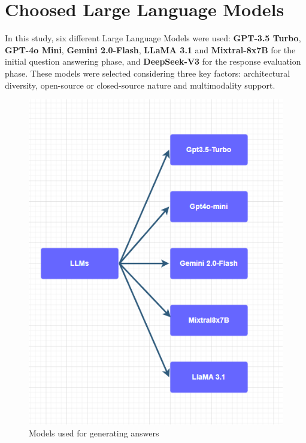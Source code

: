 \section{Choosed Large Language Models}
In this study, six different Large Language Models were used: \textbf{GPT-3.5 Turbo}, \textbf{GPT-4o Mini}, \textbf{Gemini 2.0-Flash}, \textbf{LLaMA 3.1} and \textbf{Mixtral-8x7B} for the initial question answering phase, and \textbf{DeepSeek-V3} for the response evaluation phase. These models were selected considering three key factors: architectural diversity, open-source or closed-source nature and multimodality support.
\begin{figure}[h]
    \centering
    \includegraphics[width=0.7\linewidth]{Figures/Models.png}
    \caption{Models used for generating answers}
    \label{fig:graph}
\end{figure}
